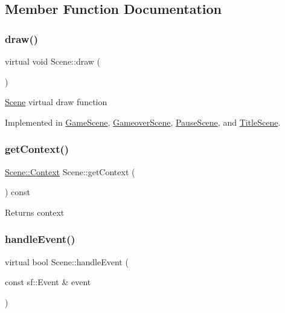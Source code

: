 \subsection{Member Function Documentation}
\mbox{\label{class_scene_a789c16961aa1e316b2a4a05b95187546}} 
\subsubsection{\texorpdfstring{draw()}{draw()}}
{\footnotesize\ttfamily virtual void Scene\+::draw (\begin{DoxyParamCaption}{ }\end{DoxyParamCaption})\hspace{0.3cm}{\ttfamily [pure virtual]}}

\hyperlink{class_scene}{Scene} virtual draw function 

Implemented in \hyperlink{class_game_scene_ae9eb60cbb8fa55eeb07b951e3d83f426}{Game\+Scene}, \hyperlink{class_gameover_scene_ae8a5e79e002d0e79edaec9ec1b0df902}{Gameover\+Scene}, \hyperlink{class_pause_scene_abfd1398a064a83b3ae6ac5fd98aebf05}{Pause\+Scene}, and \hyperlink{class_title_scene_a3e527255771f75a41c4fe8aaa35999dd}{Title\+Scene}.

\mbox{\label{class_scene_acab4ecf24b21ffa8e423a8e4fd45c491}} 
\subsubsection{\texorpdfstring{get\+Context()}{getContext()}}
{\footnotesize\ttfamily \hyperlink{struct_scene_1_1_context}{Scene\+::\+Context} Scene\+::get\+Context (\begin{DoxyParamCaption}{ }\end{DoxyParamCaption}) const\hspace{0.3cm}{\ttfamily [protected]}}

Returns context \mbox{\label{class_scene_af25e4d2c998aca4e95899fb67488e815}} 
\subsubsection{\texorpdfstring{handle\+Event()}{handleEvent()}}
{\footnotesize\ttfamily virtual bool Scene\+::handle\+Event (\begin{DoxyParamCaption}\item[{const sf\+::\+Event \&}]{event }\end{DoxyParamCaption})\hspace{0.3cm}{\ttfamily [pure virtual]}}

